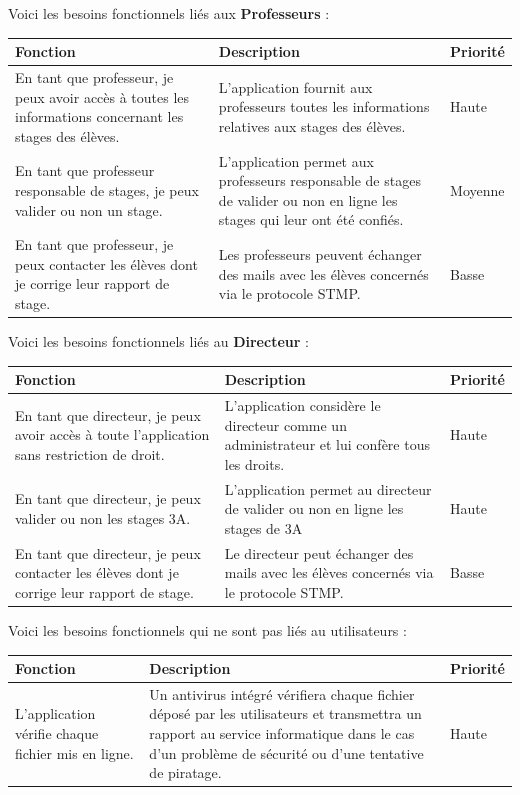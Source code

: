 \documentclass{scrreprt}
\begin{document}
\vspace{1cm}
Voici les besoins fonctionnels liés aux \textbf{Professeurs} :
\begin{center}
\begin{tabular}{|p{5cm}|p{7cm}|p{2cm}|}
  \hline
  \textbf {Fonction} & \textbf {Description} & \textbf {Priorité} \\
  \hline
  En tant que professeur, je peux avoir accès à toutes les informations concernant les stages des élèves. & L'application fournit aux professeurs toutes les informations relatives aux stages des élèves. & Haute\\
  \hline
  En tant que professeur responsable de stages, je peux valider ou non un stage. & L'application permet aux professeurs responsable de stages de valider ou non en ligne les stages qui leur ont été confiés. & Moyenne\\ 
  \hline
  En tant que professeur, je peux contacter les élèves dont je corrige leur rapport de stage. & Les professeurs peuvent échanger des mails avec les élèves concernés via le protocole STMP. & Basse\\ 
  \hline
\end{tabular}
\end{center}

\vspace{1cm}
Voici les besoins fonctionnels liés au \textbf{Directeur} :
\begin{center}
\begin{tabular}{|p{5cm}|p{7cm}|p{2cm}|}
  \hline
  \textbf {Fonction} & \textbf {Description} & \textbf {Priorité} \\
  \hline
  En tant que directeur, je peux avoir accès à toute l'application sans restriction de droit. & L'application considère le directeur comme un administrateur et lui confère tous les droits. & Haute\\
  \hline
  En tant que directeur, je peux valider ou non les stages 3A. & L'application permet au directeur de valider ou non en ligne les stages de 3A & Haute\\ 
  \hline
  En tant que directeur, je peux contacter les élèves dont je corrige leur rapport de stage. & Le directeur peut échanger des mails avec les élèves concernés via le protocole STMP. & Basse\\ 
  \hline
\end{tabular}
\end{center}

\vspace{1cm}
Voici les besoins fonctionnels qui ne sont pas liés au utilisateurs :
\begin{center}
\begin{tabular}{|p{5cm}|p{7cm}|p{2cm}|}
  \hline
  \textbf {Fonction} & \textbf {Description} & \textbf {Priorité} \\
  \hline
  L'application vérifie chaque fichier mis en ligne. & Un antivirus intégré vérifiera chaque fichier déposé par les utilisateurs et transmettra un rapport au service informatique dans le cas d'un problème de sécurité ou d'une tentative de piratage. & Haute\\
  \hline
\end{tabular}
\end{center}
\end{document}
